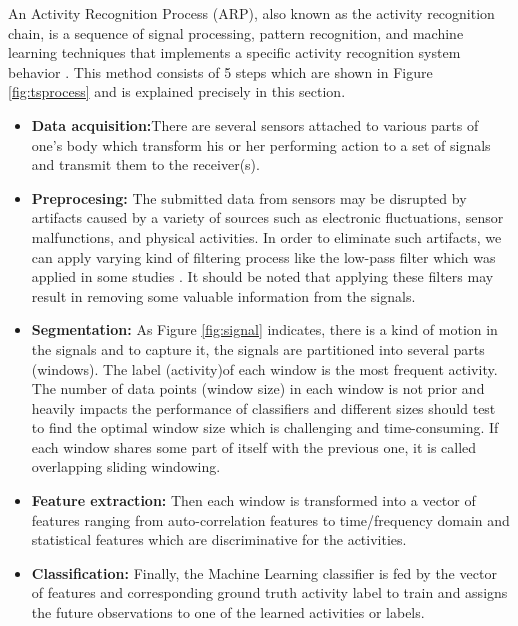An Activity Recognition Process (ARP), also known as the activity recognition chain, is a sequence of signal processing, pattern recognition, and machine learning techniques that implements a specific activity recognition system behavior \cite{bulling2014tutorial}. This method consists of 5 steps which are shown in Figure \ref{fig:tsprocess} and is explained precisely in this section.
\begin{itemize}
\item \textbf{Data acquisition:}There are several sensors attached to various parts of one's body which transform his or her performing action to a set of signals and transmit them to the receiver(s). 
\item \textbf{Preprocesing:} The submitted data from sensors may be disrupted by artifacts caused
by a variety of sources such as electronic fluctuations, sensor malfunctions, and physical activities. In order to eliminate such artifacts, we can apply varying kind of filtering process like the low-pass filter which was applied in some studies \cite{morris2014recofit}. It should be noted that applying these filters may result in removing some valuable information from the signals.  
\item \textbf{Segmentation:}
As Figure \ref{fig:signal} indicates, there is a kind of motion in the signals and to capture it, the signals are partitioned into several parts (windows). The label (activity)of each window is the most frequent activity. The number of data points (window size) in each window is not prior and heavily impacts the performance of classifiers \cite{bulling2014tutorial} and different sizes should test to find the optimal window size which is challenging and time-consuming. If each window shares some part of itself with the previous one, it is called overlapping sliding windowing.  

\item \textbf{Feature extraction:}
Then each window is transformed into a vector of features ranging from auto-correlation features \cite{morris2014recofit} to time/frequency domain and statistical features which are discriminative for the activities.
\item \textbf{Classification:}
Finally, the Machine Learning classifier is fed by the vector of features and corresponding ground truth activity label to train and assigns the future observations to one of the learned activities or labels.


\end{itemize}


